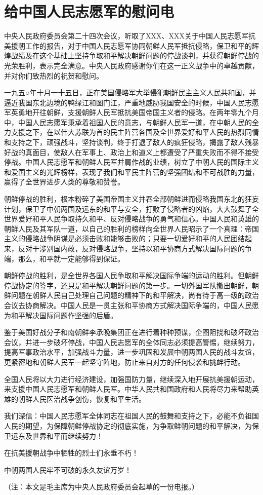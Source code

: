 \section[给中国人民志愿军的慰问电（一九五三年九月十二日）]{给中国人民志愿军的慰问电}


中央人民政府委员会第二十四次会议，听取了XXX、XXX关于中国人民志愿军抗美援朝工作的报告，对于中国人民志愿军协同朝鲜人民军抵抗侵略，保卫和平的辉煌战绩及在这个基础上坚持争取和平解决朝鲜问题的停战谈判，并获得朝鲜停战的光荣胜利，表示完全满意。中央人民政府感谢你们在这一正义战争中的卓越贡献，并对你们致热烈的祝贺和慰问。

一九五○年十月一十五日，正在美国侵略军大举侵犯朝鲜民主主义人民共和国，并逼近我国东北边境的鸭绿江和图门江，严重地威胁我国安全的时候，中国人民志愿军英勇地开往朝鲜，支援朝鲜人民军抵抗美国帝国主义者的侵略。在两年零九个月中，中国人民志愿军秉承着祖国人民的意志，与朝鲜人民军一道，在中朝人民的全力支援之下，在以伟大苏联为首的民主阵营各国及全世界爱好和平人民的热烈同情和支持之下，顽强战斗，坚持谈判，终于打退了敌人的疯狂侵略，揭露了敌人残暴好战的真面目，使敌人在军事上、政治上和道义上都遭受了严重失败而不得不接受停战。中国人民志愿军和朝鲜人民军并肩作战的业绩，树立了中朝人民的国际主义和爱国主义的光辉榜样，表现了我们和平民主阵营的坚强团结和不可战胜的力量，赢得了全世界进步人类的尊敬和赞誉。

朝鲜停战的胜利，根本粉碎了美国帝国主义并吞全部朝鲜进而侵略我国东北的狂妄计划，保卫了中朝两国及远东的和平与安全，打败了侵略者的凶焰，大大鼓舞了全世界爱好和平人民争取持久和平、反对侵略战争的勇气和信心。中国人民和英雄的朝鲜人民及其军队一道，以自己的胜利的榜样向全世界人民昭示了一个真理：帝国主义的侵略战争阴谋是必须击败和能够击败的；只要一切爱好和平的人民团结起来，反对干涉别国内政，反对侵略战争，坚持以和平协商方式解决国际问题的争端，那么，和平就一定能够得到保证。

朝鲜停战的胜利，是全世界各国人民争取和平解决国际争端的运动的胜利。但朝鲜停战协定的签字，还只是和平解决朝鲜问题的第一步。一切外国军队撤出朝鲜，朝鲜问题在朝鲜人民自己处理自己问题的精神下的和平解决，尚有待于高一级的政治会议去协商解决。中国人民是一贯主张和平协商方式解决国际争端的，中国人民愿为和平解决国际问题作坚强的后盾。

鉴于美国好战分子和南朝鲜李承晚集团正在进行着种种预谋，企图阻挠和破坏政治会议，并进一步破坏停战，中国人民志愿军的全体同志必须提高警惕，继续努力，提高军事政治水平，加强战斗力量，进一步巩固和发展中朝两国人民的战斗友谊，更紧密地和朝鲜人民军一起坚守阵地，防止来自对方的任何侵袭和挑衅行动。

全国人民将以大力进行经济建设，加强国防力量，继续深入地开展抗美援朝运动，来支援中国人民志愿军和朝鲜人民军。中华人民共和国政府和人民将尽力来帮助英雄的朝鲜人民医治战争创伤，恢复和平生活。

我们深信：中国人民志愿军全体同志在祖国人民的鼓舞和支持之下，必能不负祖国人民的期望，为保障朝鲜停战协定的彻底实施，为争取鲜朝问题的和平解决，为保卫远东及世界和平而继续努力！

在抗美援朝战争中牺牲的烈士们永垂不朽！

中朝两国人民牢不可破的永久友谊万岁！

（注：本文是毛主席为中央人民政府委员会起草的一份电报。）


